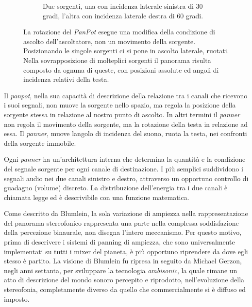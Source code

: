 \begin{figure}[t!]
\begin{subfigure}[t]{0.9\textwidth}
        \caption{Due sorgenti, una con incidenza laterale sinistra di 30 gradi,
        l'altra con incidenza laterale destra di 60 gradi.}
        \label{pan:both}
    \end{subfigure}
    \caption{La rotazione del \emph{PanPot} esegue una modifica della condizione
    di ascolto dell'ascoltatore, non un movimento della sorgente. Posizionando
    le singole sorgenti ci si pone in ascolto laterale, ruotati. Nella
    sovrapposizione di molteplici sorgenti il panorama risulta composto da
    ognuna di queste, con posizioni assolute ed angoli di incidenza relativi
    della testa.}
    \label{pan:all}
\end{figure}

Il \emph{panpot}, nella sua capacità di descrizione della relazione tra i canali
che ricevono i suoi segnali, non muove la sorgente nello spazio, ma regola la
posizione della sorgente stessa in relazione al nostro punto di ascolto. In
altri termini il \emph{panner} non regola il movimento della sorgente, ma la
rotazione della testa in relazione ad essa. Il \emph{panner}, muove langolo di
incidenza del suono, ruota la testa, nei confronti della sorgente immobile.

Ogni \emph{panner} ha un'architettura interna che determina la quantità e la
condizione del segnale sorgente per ogni canale di destinazione. I più semplici
suddividono i segnali audio nei due canali sinistro e destro, attraverso un
opportuno controllo di guadagno (volume) discreto. La distribuzione dell'energia
tra i due canali è chiamata legge ed è descrivibile con una funzione matematica.

Come descritto da Blumlein, la sola variazione di ampiezza nella
rappresentazione del panorama stereofonico rappresenta una parte nella complessa
soddisfazione della percezione binaurale, non disegna l'intero meccanismo.
Per questo motivo, prima di descrivere i sistemi di panning di ampiezza, che
sono universalmente implementati su tutti i mixer del pianeta, è più opportuno
riprendere da dove egli stesso è partito. La visione di Blumlein fu ripresa in
seguito da Michael Gerzon, negli anni settanta, per sviluppare la tecnologia
\emph{ambisonic}, la quale rimane un atto di descrizione del mondo sonoro
percepito e riprodotto, nell'evoluzione della stereofonia, completamente diverso
da quello che commercialmente si è diffuso ed imposto.

